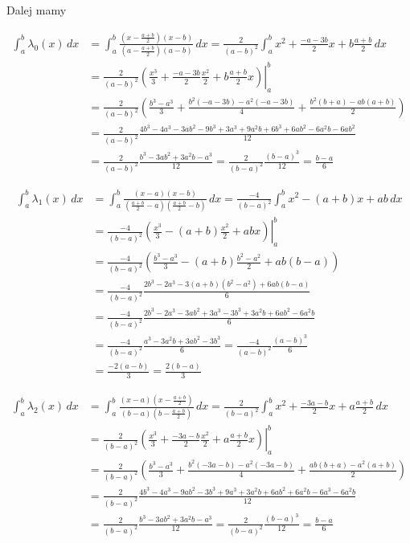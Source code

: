 \documentclass{article}
\theoremstyle{definition}
\begin{document}
Dalej mamy

\begin{align*}
    \int_a^b \lambda_0(x) \,dx &= 
    \int_a^b \frac{(x-\frac{a+b}{2})(x-b)}{(a-\frac{a+b}{2})(a-b)} \,dx =
    \frac{2}{(a-b)^2} \int_a^b x^2 + \frac{-a-3b}{2}x + b\frac{a+b}{2} \,dx \\
    &= \frac{2}{(a-b)^2} \left. \left( \frac{x^3}{3} + \frac{-a-3b}{2} \frac{x^2}{2} +  b\frac{a+b}{2}x \right) \right\vert_a^b \\
    &=  \frac{2}{(a-b)^2} \left( \frac{b^3-a^3}{3} + \frac{b^2(-a-3b)-a^2(-a-3b)}{4} + \frac{b^2(b+a) - ab(a+b)}{2} \right) \\
    &= \frac{2}{(a-b)^2} \frac{4b^3 - 4a^3 - 3ab^2 - 9b^3 + 3a^3 + 9a^2b +6b^3 + 6ab^2 - 6a^2b - 6ab^2}{12} \\
    &= \frac{2}{(a-b)^2} \frac{b^3 - 3ab^2 + 3a^2b  - a^3}{12} = \frac{2}{(b-a)^2} \frac{(b-a)^3}{12} = \frac{b-a}{6}
\end{align*}

\begin{align*}
    \int_a^b \lambda_1(x) \,dx &=
    \int_a^b \frac{(x-a)(x-b)}{(\frac{a+b}{2}-a)(\frac{a+b}{2}-b)} \,dx 
    = \frac{-4}{(b-a)^2} \int_a^b x^2 - (a+b)x + ab \,dx \\
    &= \frac{-4}{(b-a)^2} \left. \left( \frac{x^3}{3} - (a+b)\frac{x^2}{2} + abx \right) \right\vert_a^b \\
    &= \frac{-4}{(b-a)^2}  \left( \frac{b^3-a^3}{3} - (a+b)\frac{b^2 - a^2}{2} + ab(b-a) \right) \\
    &= \frac{-4}{(b-a)^2} \frac{2b^3 - 2a^3 - 3(a+b)(b^2 - a^2) + 6ab(b-a)}{6} \\
    &= \frac{-4}{(b-a)^2} \frac{2b^3 - 2a^3 - 3ab^2 + 3a^3 - 3b^3 + 3a^2b + 6ab^2 - 6a^2b}{6} \\
    &= \frac{-4}{(b-a)^2} \frac{a^3 - 3a^2b + 3ab^2 - 3b^3}{6} 
    = \frac{-4}{(a-b)^2} \frac{(a-b)^3}{6}  \\
    &= \frac{-2(a-b)}{3} = \frac{2(b-a)}{3}
\end{align*}

\begin{align*}
    \int_a^b \lambda_2(x) \,dx &= 
    \int_a^b \frac{(x-a)(x-\frac{a+b}{2})}{(b-a)(b-\frac{a+b}{2})} \,dx =
    \frac{2}{(b-a)^2} \int_a^b x^2 + \frac{-3a-b}{2}x + a\frac{a+b}{2} \,dx \\
    &= \frac{2}{(b-a)^2} \left. \left( \frac{x^3}{3} + \frac{-3a-b}{2} \frac{x^2}{2} +  a\frac{a+b}{2}x \right) \right\vert_a^b \\
    &=  \frac{2}{(b-a)^2} \left( \frac{b^3-a^3}{3} + \frac{b^2(-3a-b)-a^2(-3a-b)}{4} + \frac{ab(b+a) - a^2(a+b)}{2} \right) \\
    &= \frac{2}{(b-a)^2} \frac{4b^3 - 4a^3 - 9ab^2 - 3b^3 + 9a^3 + 3a^2b + 6ab^2 + 6a^2b - 6a^3 - 6a^2b}{12} \\
    &= \frac{2}{(b-a)^2} \frac{b^3 - 3ab^2 + 3a^2b - a^3}{12} 
    = \frac{2}{(b-a)^2} \frac{(b-a)^3}{12} = \frac{b-a}{6}
\end{align*}
\end{document}
